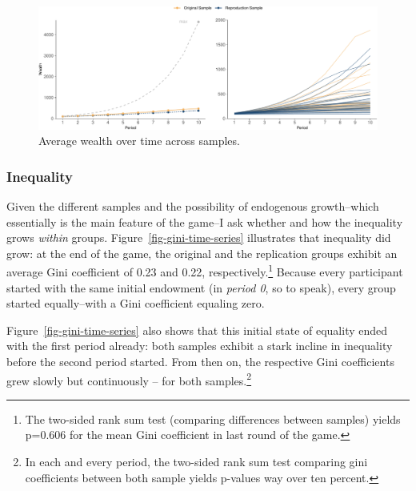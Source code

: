 \documentclass[
  authoryear,
  review,
  3p,
  onecolumn]{elsarticle}
\begin{document}
\begin{figure}

{\centering \includegraphics{paper_files/figure-pdf/fig-growth-heterogeneity-1.pdf}

}

\caption{\label{fig-growth-heterogeneity}Average wealth over time across
samples.}

\end{figure}

\hypertarget{sec-inequality}{%
\subsubsection{Inequality}\label{sec-inequality}}

Given the different samples and the possibility of endogenous
growth--which essentially is the main feature of the game--I ask whether
and how the inequality grows \emph{within} groups.
Figure~\ref{fig-gini-time-series} illustrates that inequality did grow:
at the end of the game, the original and the replication groups exhibit
an average Gini coefficient of 0.23 and 0.22, respectively.\footnote{The
  two-sided rank sum test (comparing differences between samples) yields
  p=0.606 for the mean Gini coefficient in last round of the game.}
Because every participant started with the same initial endowment (in
\emph{period 0}, so to speak), every group started equally--with a Gini
coefficient equaling zero.

Figure~\ref{fig-gini-time-series} also shows that this initial state of
equality ended with the first period already: both samples exhibit a
stark incline in inequality before the second period started. From then
on, the respective Gini coefficients grew slowly but continuously -- for
both samples.\footnote{In each and every period, the two-sided rank sum
  test comparing gini coefficients between both sample yields p-values
  way over ten percent.}
\end{document}
